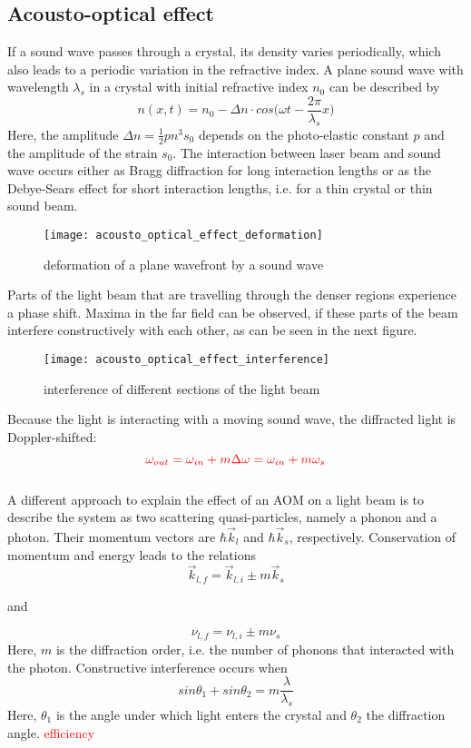 \subsection{Acousto-optical effect}
If a sound wave passes through a crystal, its density varies periodically,
which also leads to a periodic variation in the refractive index.
A plane sound wave with wavelength $\lambda_s$ in a crystal with
initial refractive index $n_0$ can be described by
$$n(x,t)=n_0-\Delta n\cdot cos\bigg(\omega t-\frac{2\pi}{\lambda_s}x\bigg)$$
Here, the amplitude $\Delta n=\frac{1}{2}pn^3s_0$ depends on the
photo-elastic constant $p$ and the amplitude of the strain $s_0$.
The interaction between laser beam and sound wave occurs either as Bragg
diffraction for long interaction lengths or as the Debye-Sears effect
for short interaction lengths, i.e. for a thin crystal or thin sound beam.
\begin{figure}[h!]
    \center
    \texttt{[image: acousto\_optical\_effect\_deformation]}
    \caption{deformation of a plane wavefront by a sound wave}
    \label{acousto_optical_effect_deformation}
\end{figure}
Parts of the light beam that are travelling through the denser regions
experience a phase shift. Maxima in the far field can be observed, if
these parts of the beam interfere constructively with each other, as can
be seen in the next figure.
\begin{figure}[h!]
    \center
    \texttt{[image: acousto\_optical\_effect\_interference]}
    \caption{interference of different sections of the light beam}
    \label{acousto_optical_effect_interference}
\end{figure}
Because the light is interacting with a moving sound wave, the
diffracted light is Doppler-shifted: $$\textcolor{red}{\omega_{out}=
\omega_{in}+m\Delta\omega=\omega_{in}+m\omega_s}$$
\\
A different approach to explain the effect of an AOM on a light beam is to
describe the system as two scattering quasi-particles, namely a phonon
and a photon. Their momentum vectors are $\hbar\vec k_l$ and $\hbar\vec k_s$,
respectively. Conservation of momentum and energy leads to the relations
$$\vec k_{l,f}=\vec k_{l,i}\pm m\vec k_s$$
\begin{center}and\end{center}
$$\nu_{l,f}=\nu_{l,i}\pm m\nu_s$$
Here, $m$ is the diffraction order, i.e. the number of phonons that
interacted with the photon. Constructive interference occurs when
$$sin\theta_1+sin\theta_2=m\frac{\lambda}{\lambda_s}$$
Here, $\theta_1$ is the angle under which light enters the crystal
and $\theta_2$ the diffraction angle.
\textcolor{red}{efficiency}

